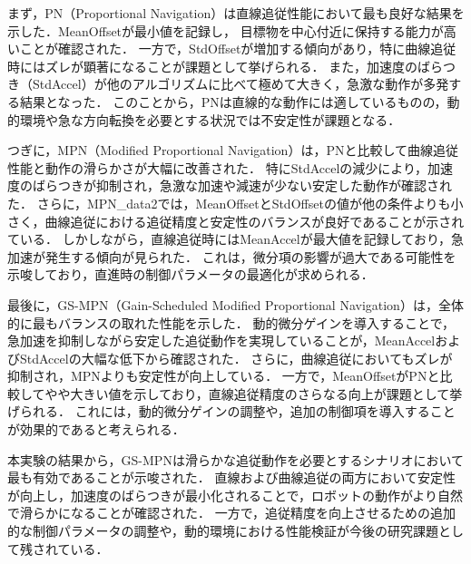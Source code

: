 まず，PN（Proportional Navigation）は直線追従性能において最も良好な結果を示した．MeanOffsetが最小値を記録し，
目標物を中心付近に保持する能力が高いことが確認された．
一方で，StdOffsetが増加する傾向があり，特に曲線追従時にはズレが顕著になることが課題として挙げられる．
また，加速度のばらつき（StdAccel）が他のアルゴリズムに比べて極めて大きく，急激な動作が多発する結果となった．
このことから，PNは直線的な動作には適しているものの，動的環境や急な方向転換を必要とする状況では不安定性が課題となる．

つぎに，MPN（Modified Proportional Navigation）は，PNと比較して曲線追従性能と動作の滑らかさが大幅に改善された．
特にStdAccelの減少により，加速度のばらつきが抑制され，急激な加速や減速が少ない安定した動作が確認された．
さらに，MPN\_data2では，MeanOffsetとStdOffsetの値が他の条件よりも小さく，曲線追従における追従精度と安定性のバランスが良好であることが示されている．
しかしながら，直線追従時にはMeanAccelが最大値を記録しており，急加速が発生する傾向が見られた．
これは，微分項の影響が過大である可能性を示唆しており，直進時の制御パラメータの最適化が求められる．

最後に，GS-MPN（Gain-Scheduled Modified Proportional Navigation）は，全体的に最もバランスの取れた性能を示した．
動的微分ゲインを導入することで，急加速を抑制しながら安定した追従動作を実現していることが，MeanAccelおよびStdAccelの大幅な低下から確認された．
さらに，曲線追従においてもズレが抑制され，MPNよりも安定性が向上している．
一方で，MeanOffsetがPNと比較してやや大きい値を示しており，直線追従精度のさらなる向上が課題として挙げられる．
これには，動的微分ゲインの調整や，追加の制御項を導入することが効果的であると考えられる．

本実験の結果から，GS-MPNは滑らかな追従動作を必要とするシナリオにおいて最も有効であることが示唆された．
直線および曲線追従の両方において安定性が向上し，加速度のばらつきが最小化されることで，ロボットの動作がより自然で滑らかになることが確認された．
一方で，追従精度を向上させるための追加的な制御パラメータの調整や，動的環境における性能検証が今後の研究課題として残されている．
